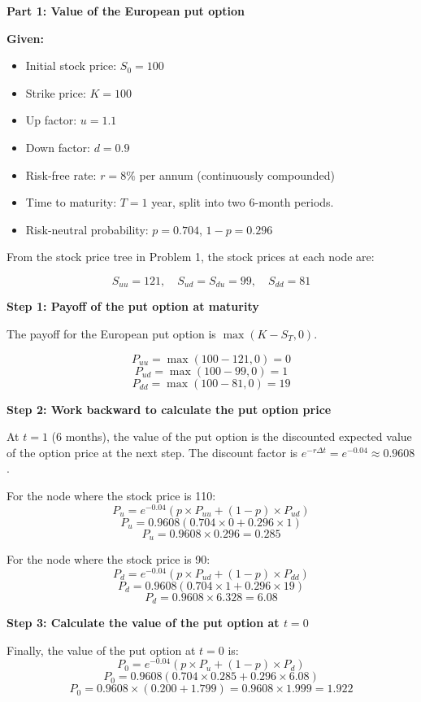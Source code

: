\documentclass[12pt,letterpaper, onecolumn]{exam}
\begin{document}
\begin{solution}
\textbf{Part 1: Value of the European put option}

\textbf{Given:}
\begin{itemize}
    \item Initial stock price: \( S_0 = 100 \)
    \item Strike price: \( K = 100 \)
    \item Up factor: \( u = 1.1 \)
    \item Down factor: \( d = 0.9 \)
    \item Risk-free rate: \( r = 8\% \) per annum (continuously compounded)
    \item Time to maturity: \( T = 1 \) year, split into two 6-month periods.
    \item Risk-neutral probability: \( p = 0.704 \), \( 1 - p = 0.296 \)
\end{itemize}

From the stock price tree in Problem 1, the stock prices at each node are:

\[
S_{uu} = 121, \quad S_{ud} = S_{du} = 99, \quad S_{dd} = 81
\]

\textbf{Step 1: Payoff of the put option at maturity}

The payoff for the European put option is \( \max(K - S_T, 0) \).

\[
P_{uu} = \max(100 - 121, 0) = 0
\]
\[
P_{ud} = \max(100 - 99, 0) = 1
\]
\[
P_{dd} = \max(100 - 81, 0) = 19
\]

\textbf{Step 2: Work backward to calculate the put option price}

At \( t = 1 \) (6 months), the value of the put option is the discounted expected value of the option price at the next step. The discount factor is \( e^{-r \Delta t} = e^{-0.04} \approx 0.9608 \).

For the node where the stock price is 110:
\[
P_u = e^{-0.04} \left( p \times P_{uu} + (1 - p) \times P_{ud} \right)
\]
\[
P_u = 0.9608 \left( 0.704 \times 0 + 0.296 \times 1 \right)
\]
\[
P_u = 0.9608 \times 0.296 = 0.285
\]

For the node where the stock price is 90:
\[
P_d = e^{-0.04} \left( p \times P_{ud} + (1 - p) \times P_{dd} \right)
\]
\[
P_d = 0.9608 \left( 0.704 \times 1 + 0.296 \times 19 \right)
\]
\[
P_d = 0.9608 \times 6.328 = 6.08
\]

\textbf{Step 3: Calculate the value of the put option at \( t = 0 \)}

Finally, the value of the put option at \( t = 0 \) is:
\[
P_0 = e^{-0.04} \left( p \times P_u + (1 - p) \times P_d \right)
\]
\[
P_0 = 0.9608 \left( 0.704 \times 0.285 + 0.296 \times 6.08 \right)
\]
\[
P_0 = 0.9608 \times (0.200 + 1.799) = 0.9608 \times 1.999 = 1.922
\]


\end{solution}
\end{document}
